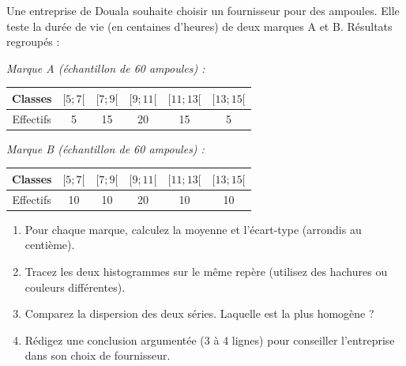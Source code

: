 \documentclass[11pt]{article}
\begin{document}
\begin{exercice}
Une entreprise de Douala souhaite choisir un fournisseur pour des ampoules. Elle teste la durée de vie (en centaines d'heures) de deux marques A et B. Résultats regroupés :

\emph{Marque A (échantillon de 60 ampoules) :}
\begin{center}
\begin{tabular}{|c|c|c|c|c|c|}\hline
Classes & $[5;7[$ & $[7;9[$ & $[9;11[$ & $[11;13[$ & $[13;15[$ \\ \hline
Effectifs & 5 & 15 & 20 & 15 & 5 \\ \hline
\end{tabular}
\end{center}

\emph{Marque B (échantillon de 60 ampoules) :}
\begin{center}
\begin{tabular}{|c|c|c|c|c|c|}\hline
Classes & $[5;7[$ & $[7;9[$ & $[9;11[$ & $[11;13[$ & $[13;15[$ \\ \hline
Effectifs & 10 & 10 & 20 & 10 & 10 \\ \hline
\end{tabular}
\end{center}

\begin{enumerate}
    \item Pour chaque marque, calculez la moyenne et l'écart-type (arrondis au centième).
    \item Tracez les deux histogrammes sur le même repère (utilisez des hachures ou couleurs différentes).
    \item Comparez la dispersion des deux séries. Laquelle est la plus homogène ?
    \item Rédigez une conclusion argumentée (3 à 4 lignes) pour conseiller l'entreprise dans son choix de fournisseur.
\end{enumerate}
\end{exercice}
\end{document}
